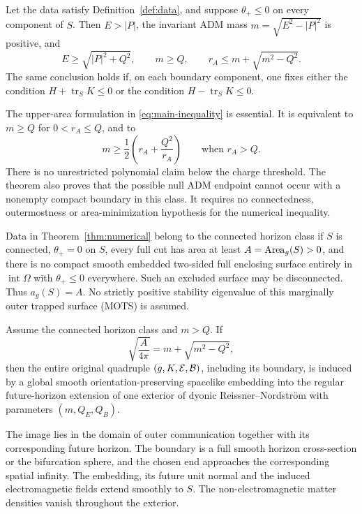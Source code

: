 \begin{theorem}\label{thm:numerical}
Let the data satisfy Definition~\ref{def:data}, and suppose
$\theta_+\le0$ on every component of $S$. Then $E>|P|$, the invariant
ADM mass $m=\sqrt{E^2-|P|^2}$ is positive, and
\begin{equation}\label{eq:main-inequality}
 E\ge\sqrt{|P|^2+Q^2},\qquad
 m\ge Q,\qquad
 r_A\le m+\sqrt{m^2-Q^2}.
\end{equation}
The same conclusion holds if, on each boundary component, one fixes
either the condition $H+\operatorname{tr}_S K\le0$ or the condition
$H-\operatorname{tr}_S K\le0$.
\end{theorem}

The upper-area formulation in \eqref{eq:main-inequality} is essential.
It is equivalent to $m\ge Q$ for $0<r_A\le Q$, and to
\begin{equation}\label{eq:polynomial-branch}
 m\ge\frac12\left(r_A+\frac{Q^2}{r_A}\right)
 \qquad\text{when }r_A>Q.
\end{equation}
There is no unrestricted polynomial claim below the charge threshold.
The theorem also proves that the possible null ADM endpoint cannot occur
with a nonempty compact boundary in this class. It requires no
connectedness, outermostness or area-minimization hypothesis for the
numerical inequality.

\begin{definition}\label{def:rigidity-class}
Data in Theorem~\ref{thm:numerical} belong to the connected horizon class
if $S$ is connected, $\theta_+=0$ on $S$, every full cut has area at least
$A=\operatorname{Area}_g(S)>0$, and there is no compact smooth embedded two-sided full
enclosing surface entirely in $\operatorname{int}\Omega$ with
$\theta_+\le0$ everywhere. Such an excluded surface may be disconnected.
Thus $a_g(S)=A$. No strictly positive stability eigenvalue of this
marginally outer trapped surface (MOTS) is assumed.
\end{definition}

\begin{theorem}\label{thm:rigidity}
Assume the connected horizon class and $m>Q$. If
\begin{equation}\label{eq:main-equality}
 \sqrt{\frac{A}{4\pi}}=m+\sqrt{m^2-Q^2},
\end{equation}
then the entire original quadruple $(g,K,\mathcal E,\mathcal B)$, including its
boundary, is induced by a global smooth orientation-preserving spacelike
embedding into the regular future-horizon extension of one exterior of
dyonic Reissner--Nordstr\"om with parameters $(m,Q_E,Q_B)$.

The image lies in the domain of outer communication together with its
corresponding future horizon. The boundary is a full smooth horizon
cross-section or the bifurcation sphere, and the chosen end approaches
the corresponding spatial infinity. The embedding, its future unit
normal and the induced electromagnetic fields extend smoothly to $S$.
The non-electromagnetic matter densities vanish throughout the exterior.
\end{theorem}

